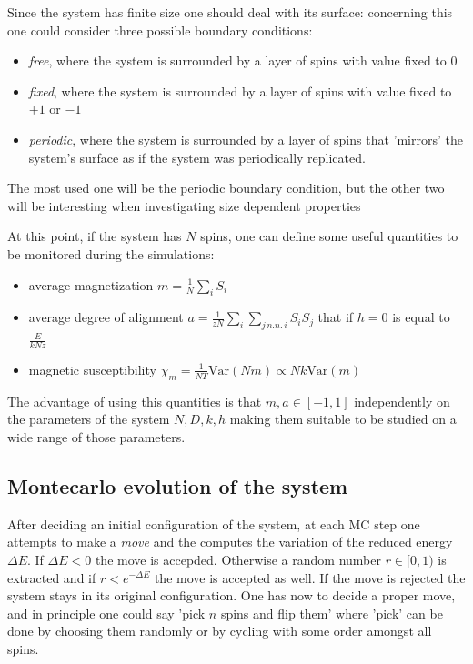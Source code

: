 \documentclass[a4paper, 11pt]{article}
\begin{document}
    Since the system has finite size one should deal with its surface: concerning this one could consider three possible boundary conditions:
    \begin{itemize}
      \item \emph{free}, where the system is surrounded by a layer of spins with value fixed to $0$
      \item \emph{fixed}, where the system is surrounded by a layer of spins with value fixed to $+1$ or $-1$
      \item \emph{periodic}, where the system is surrounded by a layer of spins that 'mirrors' the system's surface as if the system was periodically replicated.
    \end{itemize}
    The most used one will be the periodic boundary condition, but the other two will be interesting when investigating size dependent properties

    At this point, if the system has $N$ spins, one can define some useful quantities to be monitored during the simulations:
    \begin{itemize}
      \item average magnetization $m = \frac{1}{N} \sum_i S_i$
      \item average degree of alignment $a = \frac{1}{zN} \sum_i \sum_{j \, n.n. \, i} S_i S_j$ that if $h = 0$ is equal to $\frac{E}{kNz}$
      \item magnetic susceptibility $\chi_m = \frac{1}{NT} \text{Var}(Nm) \propto Nk\text{Var}(m)$
    \end{itemize}

    The advantage of using this quantities is that $m,a \in [-1,1]$ independently on the parameters of the system $N,D,k,h$ making them suitable to be studied on a wide range of those parameters.

  \subsection{Montecarlo evolution of the system}
    After deciding an initial configuration of the system, at each MC step one attempts to make a \emph{move} and the computes the variation of the reduced energy $\Delta E$. If $\Delta E < 0$ the move is accepded. Otherwise a random number $r \in [0,1)$ is extracted and if $r < e^{-\Delta E}$ the move is accepted as well. If the move is rejected the system stays in its original configuration.
    One has now to decide a proper move, and in principle one could say 'pick $n$ spins and flip them' where 'pick' can be done by choosing them randomly or by cycling with some order amongst all spins.
\end{document}

